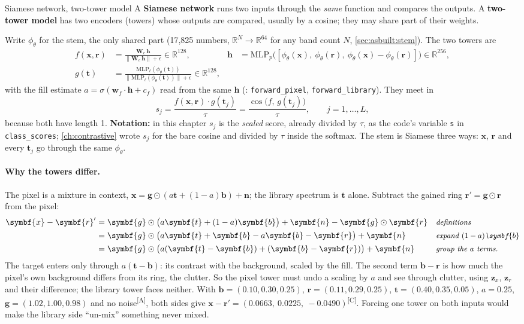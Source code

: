 \documentclass[11pt,a4paper,oneside,openany]{book}
\newcommand{\B}[1]{{\symbf{#1}}}
\newcommand{\B}[1]{{\bm{#1}}}
\newcommand{\comp}{\textsuperscript{\textsf{\scriptsize[C]}}}
\newcommand{\assm}{\textsuperscript{\textsf{\scriptsize[A]}}}
\newcommand{\R}{\mathbb{R}}
\newcommand{\nrm}[1]{\lVert #1\rVert}
\newcommand{\vx}{\B{x}}
\newcommand{\vt}{\B{t}}
\newcommand{\vb}{\B{b}}
\newcommand{\vr}{\B{r}}
\newcommand{\vn}{\B{n}}
\newcommand{\vw}{\B{w}}
\newcommand{\vz}{\B{z}}
\newcommand{\vh}{\B{h}}
\newcommand{\vg}{\B{g}}
\newcommand{\mW}{\B{W}}
\newcommand{\ahat}{\hat a}
\newcommand{\why}[1]{&&\text{\small\itshape #1}}
\begin{document}
\begin{defn}{Siamese network, two-tower model}
A \textbf{Siamese network} runs two inputs through the \emph{same} function and compares the outputs. A \textbf{two-tower model}
has two encoders (towers) whose outputs are compared, usually by a cosine; they may share part of their weights.
\end{defn}

Write $\phi_\theta$ for the stem, the only shared part (17,825 numbers, $\R^N\to\R^{64}$ for any band count $N$, \cref{sec:asbuilt:stem}). The two towers are
\begin{align}
f(\vx,\vr) &= \frac{\mW_e\,\vh}{\nrm{\mW_e\,\vh}+\epsilon}\in\R^{128}, & \vh&=\mathrm{MLP}_p\big([\phi_\theta(\vx),\ \phi_\theta(\vr),\ \phi_\theta(\vx)-\phi_\theta(\vr)]\big)\in\R^{256},
\label{eq:asbuilt:f}\\
g(\vt) &= \frac{\mathrm{MLP}_\ell(\phi_\theta(\vt))}{\nrm{\mathrm{MLP}_\ell(\phi_\theta(\vt))}+\epsilon}\in\R^{128}, \label{eq:asbuilt:g}
\end{align}
with the fill estimate $\ahat=\sigma(\vw_f\cdot\vh+c_f)$ read from the same $\vh$ (: \texttt{forward\_pixel}, \texttt{forward\_library}). They meet in
\begin{equation}
s_j=\frac{f(\vx,\vr)\cdot g(\vt_j)}{\tau}=\frac{\cos\big(f,\,g(\vt_j)\big)}{\tau},\qquad j=1,\dots,L,
\label{eq:asbuilt:sj}
\end{equation}
because both have length 1. \textbf{Notation:} in this chapter $s_j$ is the \emph{scaled} score, already divided by $\tau$, as the code's variable \texttt{s} in \texttt{class\_scores}; \cref{ch:contrastive} wrote $s_j$ for the bare cosine and divided by $\tau$ inside the softmax. The stem is Siamese three ways: $\vx$, $\vr$ and every $\vt_j$ go through the same $\phi_\theta$.

\paragraph{Why the towers differ.} The pixel is a mixture in context, $\vx=\vg\odot(a\vt+(1-a)\vb)+\vn$; the library spectrum is $\vt$ alone. Subtract the gained ring
$\vr'=\vg\odot\vr$ from the pixel:
\begin{align*}
\vx-\vr' &= \vg\odot\big(a\vt+(1-a)\vb\big)+\vn-\vg\odot\vr \why{definitions}\\
&= \vg\odot\big(a\vt+\vb-a\vb-\vr\big)+\vn \why{expand $(1-a)\vb$}\\
&= \vg\odot\big(a(\vt-\vb)+(\vb-\vr)\big)+\vn \why{group the $a$ terms.}
\end{align*}
The target enters only through $a(\vt-\vb)$: its contrast with the background, scaled by the fill. The second term $\vb-\vr$ is how much the pixel's own background differs
from its ring, the clutter. So the pixel tower must undo a scaling by $a$ and see through clutter, using $\vz_x$, $\vz_r$ and their difference; the library tower faces neither.
With $\vb=(0.10,0.30,0.25)$, $\vr=(0.11,0.29,0.25)$, $\vt=(0.40,0.35,0.05)$, $a=0.25$, $\vg=(1.02,1.00,0.98)$ and no noise\assm, both sides give
$\vx-\vr'=(0.0663,\ 0.0225,\ -0.0490)$\comp. Forcing one tower on both inputs would make the library side ``un-mix'' something never mixed.
\end{document}
